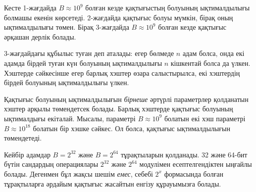 Кесте 1-жағдайда $B \approx 10^9$ болған кезде
қақтығыстың болуының ықтималдылығы болмашы екенін көрсетеді.
2-жағдайда қақтығыс болуы мүмкін, бірақ оның ықтималдылығы төмен.
Бірақ 3-жағдайда $B \approx 10^9$ болған кезде қақтығыс әрқашан
дерлік болады. 



3-жағдайдағы құбылыс туған  деп аталады:
егер бөлмеде $n$ адам болса, онда екі адамда бірдей туған
күн болуының ықтималдылығы $n$ кішкентай болса да үлкен. 
Хэштерде сәйкесінше егер барлық хэштер өзара салыстырылса,
екі хэштердің бірдей болуының ықтималдылығы үлкен. 


Қақтығыс болуының ықтималдылығын 
\emph{бірнеше} әртүрлі параметрлер қолданатын хэштер арқылы
төмендетсек болады. Барлық хэштерде қақтығыс болуының ықтималдығы
екіталай. Мысалы, параметрі $B \approx 10^9$ болатын екі хэш
параметрі $B \approx 10^{18}$ болатын бір хэшке сәйкес. Ол болса,
қақтығыс ықтималдылығын төмендетеді.


Кейбір адамдар $B=2^{32}$ және $B=2^{64}$ тұрақтыларын 
қолданады. 32 және 64-бит бүтін сандардың операциялары 
$2^{32}$ және $2^{64}$ модулімен есептелгендіктен ыңғайлы болады.
Дегенмен бұл жақсы шешім \emph{емес}, себебі $2^x$ формасында 
болған тұрақтыларға әрдайым қақтығыс жасайтын енгізу 
\cite{pac13} құрауымызға болады. 

